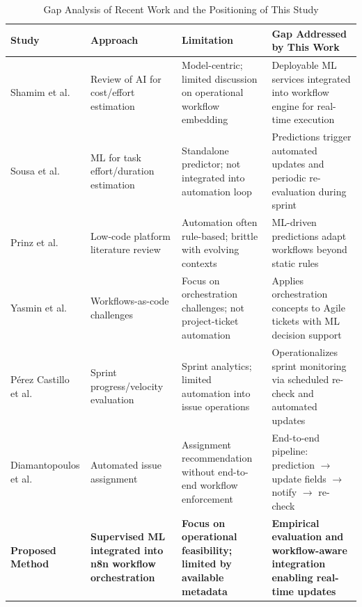 \documentclass[conference]{IEEEtran}
\begin{document}
\begin{table}[t]
\caption{Gap Analysis of Recent Work and the Positioning of This Study}
\centering
\renewcommand{\arraystretch}{1.2}
\begin{tabular}{p{3.0cm} p{4.2cm} p{4.5cm} p{5.0cm}}
\hline
\textbf{Study} & \textbf{Approach} & \textbf{Limitation} & \textbf{Gap Addressed by This Work} \\
\hline
Shamim et al. \cite{shamim2025_costreview} &
Review of AI for cost/effort estimation &
Model-centric; limited discussion on operational workflow embedding &
Deployable ML services integrated into workflow engine for real-time execution \\
Sousa et al. \cite{sousa2023_task_effort} &
ML for task effort/duration estimation &
Standalone predictor; not integrated into automation loop &
Predictions trigger automated updates and periodic re-evaluation during sprint \\
Prinz et al. \cite{prinz2021_lowcode_slr} &
Low-code platform literature review &
Automation often rule-based; brittle with evolving contexts &
ML-driven predictions adapt workflows beyond static rules \\
Yasmin et al. \cite{yasmin2024_airflow_wac} &
Workflows-as-code challenges &
Focus on orchestration challenges; not project-ticket automation &
Applies orchestration concepts to Agile tickets with ML decision support \\
P\'erez Castillo et al. \cite{perezcastillo2024_sprint_velocity} &
Sprint progress/velocity evaluation &
Sprint analytics; limited automation into issue operations &
Operationalizes sprint monitoring via scheduled re-check and automated updates \\
Diamantopoulos et al. \cite{diamantopoulos2023_issue_assignment} &
Automated issue assignment &
Assignment recommendation without end-to-end workflow enforcement &
End-to-end pipeline: prediction $\rightarrow$ update fields $\rightarrow$ notify $\rightarrow$ re-check \\
\textbf{Proposed Method} &
\textbf{Supervised ML integrated into n8n workflow orchestration} &
\textbf{Focus on operational feasibility; limited by available metadata} &
\textbf{Empirical evaluation and workflow-aware integration enabling real-time updates} \\
\hline
\end{tabular}
\label{table:gap}
\end{table}


\end{document}
